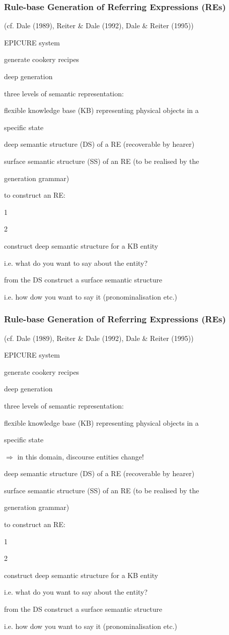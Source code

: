 \documentclass[compress,color=usenames]{beamer}
\begin{document}
\begin{frame}
\frametitle{Rule-base Generation of Referring Expressions (REs)}

(cf. Dale (1989), Reiter \& Dale (1992), Dale \& Reiter (1995))

EPICURE system

generate cookery recipes

deep generation

three levels of semantic representation:

ﬂexible knowledge base (KB) representing physical objects in a

speciﬁc state

deep semantic structure (DS) of a RE (recoverable by hearer)

surface semantic structure (SS) of an RE (to be realised by the

generation grammar)

to construct an RE:

1

2

construct deep semantic structure for a KB entity

i.e. what do you want to say about the entity?

from the DS construct a surface semantic structure

i.e. how dow you want to say it (pronominalisation etc.)

\end{frame}

\begin{frame}
\frametitle{Rule-base Generation of Referring Expressions (REs)}

(cf. Dale (1989), Reiter \& Dale (1992), Dale \& Reiter (1995))

EPICURE system

generate cookery recipes

deep generation

three levels of semantic representation:

ﬂexible knowledge base (KB) representing physical objects in a

speciﬁc state

$\Rightarrow$ in this domain, discourse entities change!

deep semantic structure (DS) of a RE (recoverable by hearer)

surface semantic structure (SS) of an RE (to be realised by the

generation grammar)

to construct an RE:

1

2

construct deep semantic structure for a KB entity

i.e. what do you want to say about the entity?

from the DS construct a surface semantic structure

i.e. how dow you want to say it (pronominalisation etc.)

\end{frame}
\end{document}
